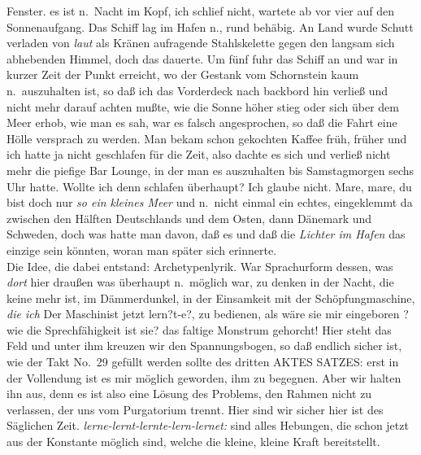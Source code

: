 \documentclass[
]{article}
\begin{document}
Fenster. es ist n.~Nacht im Kopf, ich schlief nicht, wartete ab vor vier
auf den Sonnenaufgang. Das Schiff lag im Hafen n., rund behäbig. An Land
wurde Schutt verladen von \emph{laut }als Kränen aufragende
Stahlskelette gegen den langsam sich abhebenden Himmel, doch das
dauerte. Um fünf fuhr das Schiff an und war in kurzer Zeit der Punkt
erreicht, wo der Gestank vom Schornstein kaum n.~auszuhalten ist, so daß
ich das Vorderdeck nach backbord hin verließ und nicht mehr darauf
achten mußte, wie die Sonne höher stieg oder sich über dem Meer erhob,
wie man es sah, war es falsch angesprochen, so daß die Fahrt eine Hölle
versprach zu werden. Man bekam schon gekochten Kaffee früh, früher und
ich hatte ja nicht geschlafen für die Zeit, also dachte es sich und
verließ nicht mehr die piefige Bar Lounge, in der man es auszuhalten bis
Samstagmorgen sechs Uhr hatte. Wollte ich denn schlafen überhaupt? Ich
glaube nicht. Mare, mare, du bist doch nur \emph{so ein kleines Meer
}und n.~nicht einmal ein echtes, eingeklemmt da zwischen den Hälften
Deutschlands und dem Osten, dann Dänemark und Schweden, doch was hatte
man davon, daß es und daß die \emph{Lichter im Hafen} das einzige sein
könnten, woran man später sich erinnerte.\\
Die Idee, die dabei entstand: Archetypenlyrik. War Sprachurform dessen,
was \emph{dort} hier draußen was überhaupt n.~möglich war, zu denken in
der Nacht, die keine mehr ist, im Dämmerdunkel, in der Einsamkeit mit
der Schöpfungmaschine, \emph{die ich} Der Maschinist jetzt lern?t-e?, zu
bedienen, als wäre sie mir eingeboren ?wie die Sprechfähigkeit ist sie?
das faltige Monstrum gehorcht! Hier steht das Feld und unter ihm kreuzen
wir den Spannungsbogen, so daß endlich sicher ist, wie der Takt No.~29
gefüllt werden sollte des dritten AKTES SATZES: erst in der Vollendung
ist es mir möglich geworden, ihm zu begegnen. Aber wir halten ihn aus,
denn es ist also eine Lösung des Problems, den Rahmen nicht zu
verlassen, der uns vom Purgatorium trennt. Hier sind wir sicher hier ist
des Säglichen Zeit. \emph{lerne-lernt-lernte-lern-lernet: }sind alles
Hebungen, die schon jetzt aus der Konstante möglich sind, welche die
kleine, kleine Kraft bereitstellt.
\end{document}
